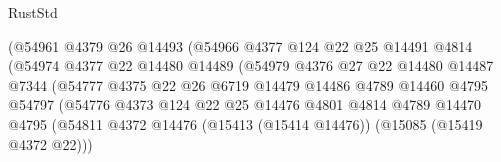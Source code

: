 \begin{lexlean}{RustStd}
\begin{coremodule}
                                      (@54961
                                        @4379
                                        @26
                                        @14493
                                        (@54966
                                          @4377
                                          @124
                                          @22
                                          @25
                                          @14491
                                          @4814
                                          (@54974
                                            @4377
                                            @22
                                            @14480
                                            @14489
                                            (@54979
                                              @4376
                                              @27
                                              @22
                                              @14480
                                              @14487
                                              @7344
                                              (@54777
                                                @4375
                                                @22
                                                @26
                                                @6719
                                                @14479
                                                @14486
                                                @4789
                                                @14460
                                                @4795
                                                @54797
                                                (@54776
                                                  @4373
                                                  @124
                                                  @22
                                                  @25
                                                  @14476
                                                  @4801
                                                  @4814
                                                  @4789
                                                  @14470
                                                  @4795
                                                  (@54811
                                                    @4372
                                                    @14476
                                                    (@15413 (@15414 @14476))
                                                    (@15085 (@15419 @4372 @22)))

\end{coremodule}
\end{lexlean}
